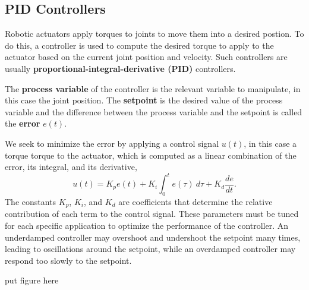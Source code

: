 \documentclass[12pt]{report}
\theoremstyle{definition}
\theoremstyle{remark}
\begin{document}
\subsection{PID Controllers}
Robotic actuators apply torques to joints to move them into a desired postion. To do this, a controller is used to compute the desired torque to apply to the actuator based on the current joint position and velocity. Such controllers are usually \textbf{proportional-integral-derivative (PID)} controllers.

The \textbf{process variable} of the controller is the relevant variable to manipulate, in this case the joint position. The \textbf{setpoint} is the desired value of the process variable and the difference between the process variable and the setpoint is called the \textbf{error} $e(t)$.

We seek to minimize the error by applying a control signal $u(t)$, in this case a torque torque to the actuator, which is computed as a linear combination of the error, its integral, and its derivative,
\begin{equation}
    u(t) = K_p e(t) + K_i \int_0^t e(\tau)\ d\tau + K_d \frac{de}{dt}.
\end{equation}
The constants $K_p$, $K_i$, and $K_d$ are coefficients that determine the relative contribution of each term to the control signal. These parameters must be tuned for each specific application to optimize the performance of the controller. An underdamped controller may overshoot and undershoot the setpoint many times, leading to oscillations around the setpoint, while an overdamped controller may respond too slowly to the setpoint.

put figure here
\end{document}
